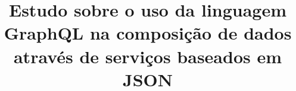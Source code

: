 \documentclass{ufsctex/ufsctex}
\title{Estudo sobre o uso da linguagem GraphQL na composição de dados através de serviços baseados em JSON}
\begin{document}

\sumario



\anexo

\end{document}

